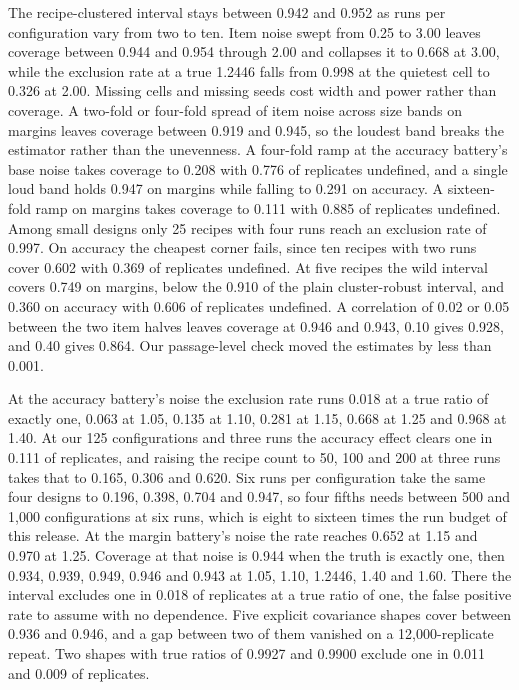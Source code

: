 The recipe-clustered interval stays between 0.942 and 0.952 as runs per configuration vary from two to ten. Item noise swept from 0.25 to 3.00 leaves coverage between 0.944 and 0.954 through 2.00 and collapses it to 0.668 at 3.00, while the exclusion rate at a true 1.2446 falls from 0.998 at the quietest cell to 0.326 at 2.00. Missing cells and missing seeds cost width and power rather than coverage. A two-fold or four-fold spread of item noise across size bands on margins leaves coverage between 0.919 and 0.945, so the loudest band breaks the estimator rather than the unevenness. A four-fold ramp at the accuracy battery's base noise takes coverage to 0.208 with 0.776 of replicates undefined, and a single loud band holds 0.947 on margins while falling to 0.291 on accuracy. A sixteen-fold ramp on margins takes coverage to 0.111 with 0.885 of replicates undefined. Among small designs only 25 recipes with four runs reach an exclusion rate of 0.997. On accuracy the cheapest corner fails, since ten recipes with two runs cover 0.602 with 0.369 of replicates undefined. At five recipes the wild interval covers 0.749 on margins, below the 0.910 of the plain cluster-robust interval, and 0.360 on accuracy with 0.606 of replicates undefined. A correlation of 0.02 or 0.05 between the two item halves leaves coverage at 0.946 and 0.943, 0.10 gives 0.928, and 0.40 gives 0.864. Our passage-level check moved the estimates by less than 0.001.

At the accuracy battery's noise the exclusion rate runs 0.018 at a true ratio of exactly one, 0.063 at 1.05, 0.135 at 1.10, 0.281 at 1.15, 0.668 at 1.25 and 0.968 at 1.40. At our 125 configurations and three runs the accuracy effect clears one in 0.111 of replicates, and raising the recipe count to 50, 100 and 200 at three runs takes that to 0.165, 0.306 and 0.620. Six runs per configuration take the same four designs to 0.196, 0.398, 0.704 and 0.947, so four fifths needs between 500 and 1,000 configurations at six runs, which is eight to sixteen times the run budget of this release. At the margin battery's noise the rate reaches 0.652 at 1.15 and 0.970 at 1.25. Coverage at that noise is 0.944 when the truth is exactly one, then 0.934, 0.939, 0.949, 0.946 and 0.943 at 1.05, 1.10, 1.2446, 1.40 and 1.60. There the interval excludes one in 0.018 of replicates at a true ratio of one, the false positive rate to assume with no dependence. Five explicit covariance shapes cover between 0.936 and 0.946, and a gap between two of them vanished on a 12,000-replicate repeat. Two shapes with true ratios of 0.9927 and 0.9900 exclude one in 0.011 and 0.009 of replicates.

